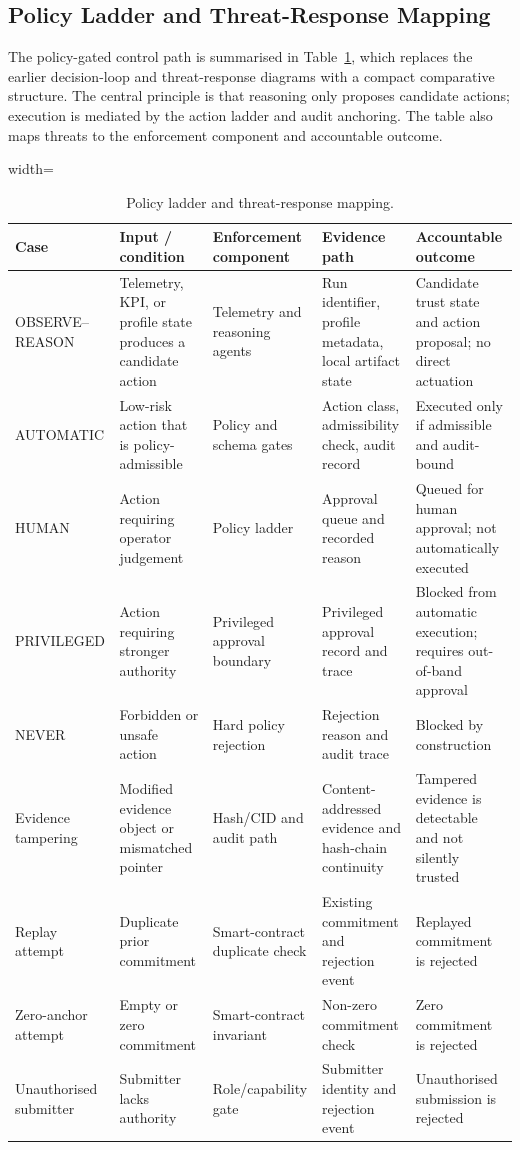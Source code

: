 \documentclass[journal]{IEEEtran}
\begin{document}
\subsection{Policy Ladder and Threat-Response Mapping}
The policy-gated control path is summarised in
Table~\ref{tab:policy-ladder}, which replaces the earlier decision-loop and
threat-response diagrams with a compact comparative structure. The central
principle is that reasoning only proposes candidate actions; execution is
mediated by the action ladder and audit anchoring. The table also maps threats to the
enforcement component and accountable outcome.
\begin{table}[!t]
\centering
\caption{Policy ladder and threat-response mapping.}
\label{tab:policy-ladder}
\begin{adjustbox}{width=\textwidth}
\begin{tabular}{p{2.9cm}p{3.9cm}p{3.7cm}p{3.7cm}p{3.6cm}}
\toprule
Case & Input / condition & Enforcement component & Evidence path & Accountable outcome \\
\midrule
OBSERVE--REASON & Telemetry, KPI, or profile state produces a candidate action
& Telemetry and reasoning agents & Run identifier, profile metadata, local
artifact state & Candidate trust state and action proposal; no direct
actuation \\
AUTOMATIC & Low-risk action that is policy-admissible & Policy and schema
gates & Action class, admissibility check, audit record & Executed only if
admissible and audit-bound \\
HUMAN & Action requiring operator judgement & Policy ladder & Approval queue
and recorded reason & Queued for human approval; not automatically executed \\
PRIVILEGED & Action requiring stronger authority & Privileged approval
boundary & Privileged approval record and trace & Blocked from automatic
execution; requires out-of-band approval \\
NEVER & Forbidden or unsafe action & Hard policy rejection & Rejection reason
and audit trace & Blocked by construction \\
Evidence tampering & Modified evidence object or mismatched pointer & Hash/CID
and audit path & Content-addressed evidence and hash-chain continuity &
Tampered evidence is detectable and not silently trusted \\
Replay attempt & Duplicate prior commitment & Smart-contract duplicate check &
Existing commitment and rejection event & Replayed commitment is rejected \\
Zero-anchor attempt & Empty or zero commitment & Smart-contract invariant &
Non-zero commitment check & Zero commitment is rejected \\
Unauthorised submitter & Submitter lacks authority & Role/capability gate &
Submitter identity and rejection event & Unauthorised submission is rejected \\
\bottomrule
\end{tabular}
\end{adjustbox}
\end{table}
\end{document}
